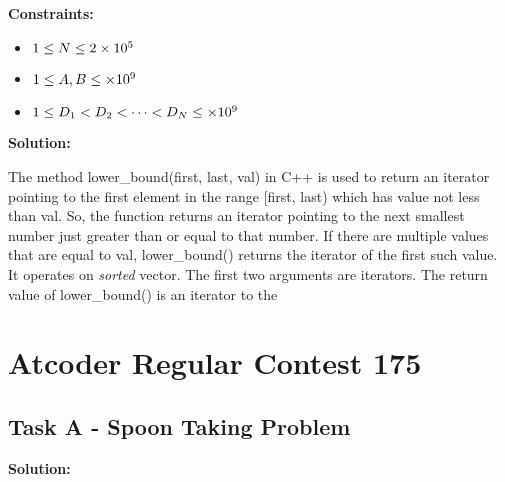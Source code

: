 	\vspace{0.5cm}
	\noindent \textbf{Constraints: }
	\begin{itemize}
		\item $ 1 \leq N \leq 2\times 10^{5} $
		\item $ 1 \leq A, B \leq \times 10^{9} $
		\item $ 1 \leq D_1 < D_2 < \dots < D_N \leq \times 10^{9} $
	\end{itemize}
	\vspace{0.5cm}
	\noindent \textbf{Solution: }
	

	\noindent The method lower\_bound(first, last, val) in C++ is used to return 
	an iterator pointing to the first element in the range [first, last) which has 
	value not less than val. So, the function returns an iterator pointing to the
	next smallest number just greater than or equal to that number. If there are multiple
	values that are equal to val, lower\_bound() returns the iterator of the first such
	value. It operates on \emph{sorted} vector. The first two arguments are iterators. The
	return value of lower\_bound() is an iterator to the 

	\section{Atcoder Regular Contest 175}
	\subsection{Task A - Spoon Taking Problem}

	\noindent \textbf{Solution: }
	




